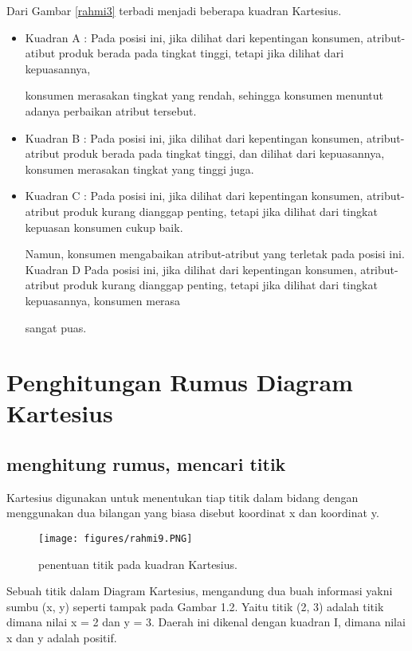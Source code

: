 Dari Gambar \ref{rahmi3} terbadi menjadi beberapa kuadran Kartesius.
\begin{itemize}
\item Kuadran A :
Pada posisi ini, jika dilihat dari kepentingan konsumen, atribut-atibut produk berada pada tingkat tinggi, tetapi jika dilihat dari kepuasannya, 

konsumen merasakan tingkat yang rendah, sehingga konsumen menuntut adanya perbaikan atribut tersebut.
\item Kuadran B :
Pada posisi ini, jika dilihat dari kepentingan konsumen, atribut-atribut produk berada pada tingkat tinggi, dan dilihat dari kepuasannya, 
konsumen merasakan tingkat yang tinggi juga.
\item Kuadran C :
Pada posisi ini, jika dilihat dari kepentingan konsumen, atribut-atribut produk kurang dianggap penting, tetapi jika dilihat dari tingkat kepuasan konsumen cukup baik.

Namun, konsumen mengabaikan atribut-atribut yang terletak pada posisi ini.
Kuadran D
Pada posisi ini, jika dilihat dari kepentingan konsumen, atribut-atribut produk kurang dianggap penting, tetapi jika dilihat dari tingkat kepuasannya, konsumen merasa

sangat puas.
\end{itemize}


\section{Penghitungan Rumus Diagram Kartesius}
\subsection{menghitung rumus, mencari titik}

Kartesius digunakan untuk menentukan tiap titik dalam bidang dengan menggunakan dua bilangan yang biasa disebut koordinat x dan koordinat y.
\begin{figure}[ht]

	\centerline{\texttt{[image: figures/rahmi9.PNG]}}
	\caption{penentuan titik pada kuadran Kartesius.}

	\label{rahmi9}
\end{figure}


Sebuah titik dalam Diagram Kartesius, mengandung dua buah informasi yakni sumbu (x, y) seperti tampak pada Gambar 1.2. 
Yaitu titik (2, 3) adalah titik dimana nilai x = 2 dan y = 3. Daerah ini dikenal dengan kuadran I, dimana nilai x dan y adalah positif.

